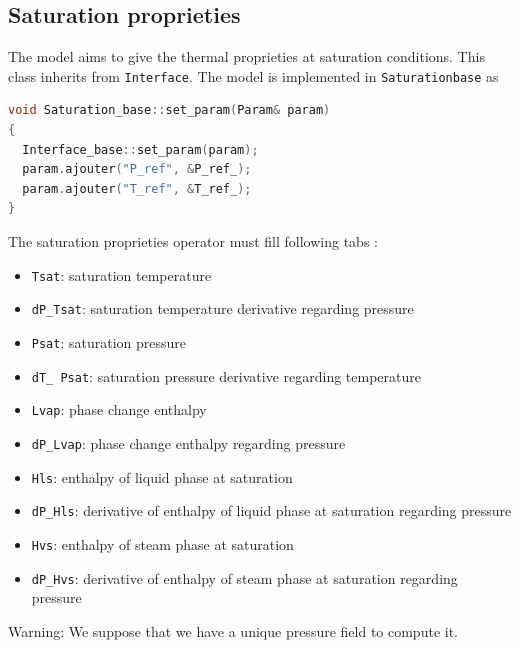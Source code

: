 \subsection{Saturation proprieties}
The model aims to give the thermal proprieties at saturation conditions. This class inherits from \texttt{Interface}.
The model is implemented in \texttt{Saturation\textunderscore base} as 
\begin{lstlisting}[language=c++]
void Saturation_base::set_param(Param& param)
{
  Interface_base::set_param(param);
  param.ajouter("P_ref", &P_ref_);
  param.ajouter("T_ref", &T_ref_);
}
\end{lstlisting}
The saturation proprieties operator must fill following tabs :
\begin{itemize}
   \item[\small \textcolor{blue}{\ding{109}}] \texttt{Tsat}: saturation temperature
   \item[\small \textcolor{blue}{\ding{109}}] \texttt{dP\_Tsat}: saturation temperature derivative regarding pressure
   \item[\small \textcolor{blue}{\ding{109}}] \texttt{Psat}: saturation pressure
   \item[\small \textcolor{blue}{\ding{109}}] \texttt{dT\_ Psat}: saturation pressure derivative regarding temperature
   \item[\small \textcolor{blue}{\ding{109}}] \texttt{Lvap}: phase change enthalpy
   \item[\small \textcolor{blue}{\ding{109}}] \texttt{dP\_Lvap}: phase change enthalpy regarding pressure
   \item[\small \textcolor{blue}{\ding{109}}] \texttt{Hls}: enthalpy of liquid phase at saturation
   \item[\small \textcolor{blue}{\ding{109}}] \texttt{dP\_Hls}: derivative of enthalpy of liquid phase at saturation regarding pressure
   \item[\small \textcolor{blue}{\ding{109}}] \texttt{Hvs}: enthalpy of steam phase at saturation
   \item[\small \textcolor{blue}{\ding{109}}] \texttt{dP\_Hvs}: derivative of enthalpy of steam phase at saturation regarding pressure
\end{itemize}

{\color{red} Warning}:  We suppose that we have a unique pressure field to compute it.

